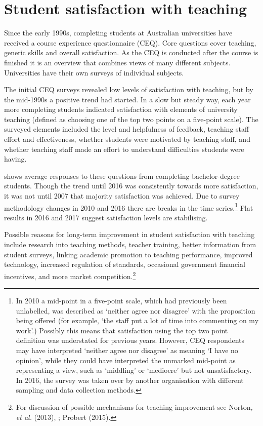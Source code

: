 \documentclass{grattan}
\begin{document}
%
\section{Student satisfaction with teaching}\label{sec:student-satisfaction-with-teaching}

Since the early 1990s, completing students at Australian universities have received a course experience questionnaire (CEQ). Core questions cover teaching, generic skills and overall satisfaction. As the CEQ is conducted after the course is finished it is an overview that combines views of many different subjects. Universities have their own surveys of individual subjects.

The initial CEQ surveys revealed low levels of satisfaction with teaching, but by the mid-1990s a positive trend had started. In a slow but steady way, each year more completing students indicated satisfaction with elements of university teaching (defined as choosing one of the top two points on a five-point scale). The surveyed elements included the level and helpfulness of feedback, teaching staff effort and effectiveness, whether students were motivated by teaching staff, and whether teaching staff made an effort to understand difficulties students were having.

 shows average responses to these questions from completing bachelor-degree students. Though the trend until 2016 was consistently towards more satisfaction, it was not until 2007 that majority satisfaction was achieved. Due to survey methodology changes in 2010 and 2016 there are breaks in the time series.\footnote{In 2010 a mid-point in a five-point scale, which had previously been unlabelled, was described as `neither agree nor disagree' with the proposition being offered (for example, `the staff put a lot of time into commenting on my work'.) Possibly this means that satisfaction using the top two point definition was understated for previous years. However, CEQ respondents may have interpreted `neither agree nor disagree' as meaning `I have no opinion', while they could have interpreted the unmarked mid-point as representing a view, such as `middling' or `mediocre' but not unsatisfactory. In 2016, the survey was taken over by another organisation with different sampling and data collection methods.} Flat results in 2016 and 2017 suggest satisfaction levels are stabilising.

Possible reasons for long-term improvement in student satisfaction with teaching include research into teaching methods, teacher training, better information from student surveys, linking academic promotion to teaching performance, improved technology, increased regulation of standards, occasional government financial incentives, and more market competition.\footnote{For discussion of possible mechanisms for teaching improvement see Norton\emph{, et al.} (2013), ; Probert (2015).}
\end{document}
